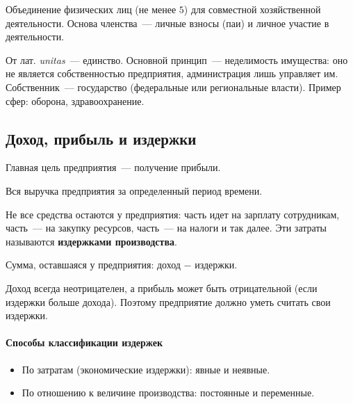 \documentclass[12pt]{article}
\begin{document}
	\begin{definition}
		Объединение физических лиц (не менее $5$) для совместной хозяйственной деятельности. Основа членства~--- личные взносы (паи) и личное участие в деятельности.
	\end{definition}

	\begin{definition}
		От лат. \textit{unitas}~--- единство. Основной принцип~--- неделимость имущества: оно не является собственностью предприятия, администрация лишь управляет им. Собственник~--- государство (федеральные или региональные власти). Пример сфер: оборона, здравоохранение.
	\end{definition}

	\subsection{Доход, прибыль и издержки}

	\noindent
	Главная цель предприятия~--- получение прибыли.

	\begin{definition}[Доход]
		Вся выручка предприятия за определенный период времени.
	\end{definition}

	\noindent
	Не все средства остаются у предприятия: часть идет на зарплату сотрудникам, часть~--- на закупку ресурсов, часть~--- на налоги и так далее. Эти затраты называются \textbf{издержками производства}.

	\begin{definition}[Прибыль]
		Сумма, оставшаяся у предприятия: доход $-$ издержки.
	\end{definition}

	\begin{note}
		Доход всегда неотрицателен, а прибыль может быть отрицательной (если издержки больше дохода). Поэтому предприятие должно уметь считать свои издержки.
	\end{note}

	\paragraph{Способы классификации издержек}
	\begin{itemize}
		\item По затратам (экономические издержки): явные и неявные.
		\item По отношению к величине производства: постоянные и переменные.
	\end{itemize}
\end{document}
